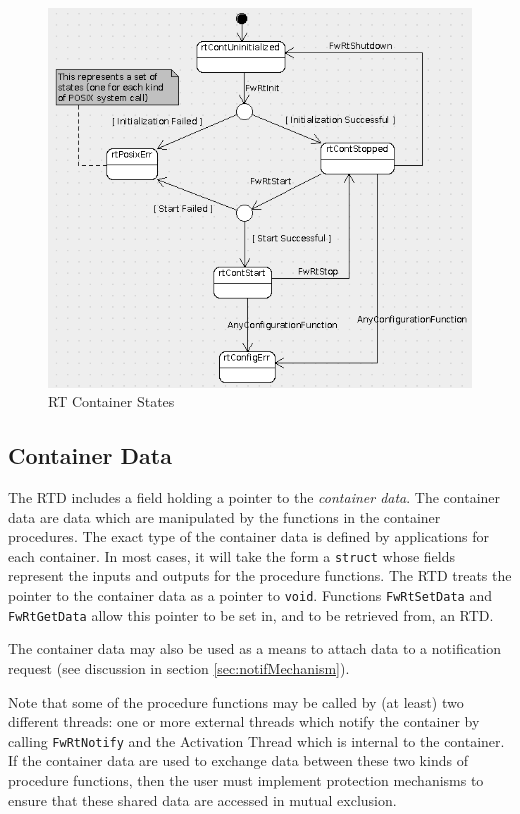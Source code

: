 \documentclass[a4paper,10pt]{article}
\begin{document}
\begin{figure}[ht]
 \centering
 \includegraphics[scale=0.43,keepaspectratio=true]{../images/RTContainerStates.png}
 \caption{RT Container States}
 \label{fig:RTContainerStates}
\end{figure}

\subsection{Container Data}\label{sec:contData}
The RTD includes a field holding a pointer to the \emph{container data}. The container data are data which are manipulated by the functions in the container procedures. The exact type of the container data is defined by applications for each container. In most cases, it will take the form a \texttt{struct} whose fields represent the inputs and outputs for the procedure functions. The RTD treats the pointer to the container data as a pointer to \texttt{void}. Functions \texttt{FwRtSetData} and \texttt{FwRtGetData} 
allow this pointer to be set in, and to be retrieved from, an RTD.

The container data may also be used as a means to attach data to a notification request (see discussion in section \ref{sec:notifMechanism}).

Note that some of the procedure functions may be called by (at least) two different threads: one or more external threads which notify the container by calling \texttt{FwRtNotify} and the Activation Thread which is internal to the container. If the container data are used to exchange data between these two kinds of procedure functions, then the user must implement protection mechanisms to ensure that these shared data are accessed in mutual exclusion.
\end{document}
